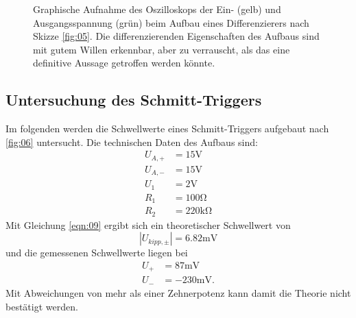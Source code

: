 \begin{figure}
\begin{subfigure}{0.4\textwidth}
  \end{subfigure}
  \caption{Graphische Aufnahme des Oszilloskops der Ein- (gelb) und Ausgangsspannung (grün) beim Aufbau eines Differenzierers nach Skizze \ref{fig:05}. Die differenzierenden Eigenschaften des Aufbaus sind mit gutem Willen erkennbar, aber zu verrauscht, als das eine definitive Aussage getroffen werden könnte.}
  \label{fig:Osz_d}
\end{figure}

\subsection{Untersuchung des Schmitt-Triggers}
Im folgenden werden die Schwellwerte eines Schmitt-Triggers aufgebaut nach \ref{fig:06} untersucht. Die technischen Daten des Aufbaus sind:
\begin{align}
  U_{A,+} &= 15\si{\volt}\\
  U_{A,-} &= 15\si{\volt}\\
  U_{1}   &= 2\si{\volt}\\
  R_{1}   &= 100\si{\ohm}\\
  R_{2}   &= 220\si{\kilo\ohm}  
\end{align}
Mit Gleichung \ref{eqn:09} ergibt sich ein theoretischer Schwellwert von
\begin{equation}
  \left|U_{kipp,\pm}\right| = 6.82\si{\milli\volt}
\end{equation}
und die gemessenen Schwellwerte liegen bei
\begin{align}
  U_+ &= 87 \si{\milli\volt}\\
  U_- &= -230 \si{\milli\volt}.
\end{align}
Mit Abweichungen von mehr als einer Zehnerpotenz kann damit die Theorie nicht bestätigt werden.





